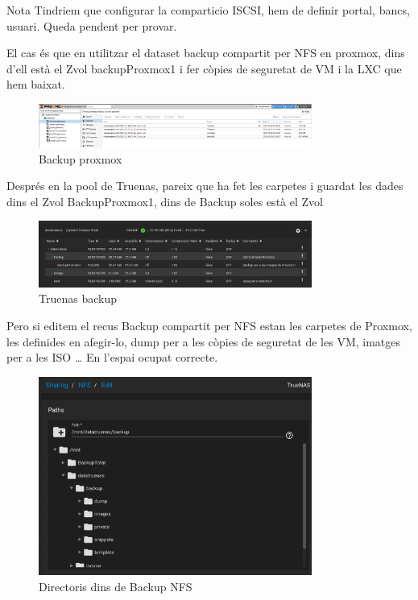 \documentclass[
  10pt,
]{krantz}
\begin{document}
\begin{rmdnote}{Nota}
Tindriem que configurar la comparticio ISCSI, hem de definir portal, bancs, usuari. Queda pendent per provar.

\end{rmdnote}

El cas és que en utilitzar el dataset backup compartit per NFS en proxmox, dins d'ell està el Zvol backupProxmox1 i fer còpies de seguretat de VM i la LXC que hem baixat.

\begin{figure}
\centering
\includegraphics[width=0.8\textwidth,height=\textheight]{imatges/proxmox/backup_proxmox_VMs.png}
\caption{Backup proxmox}
\end{figure}

Després en la pool de Truenas, pareix que ha fet les carpetes i guardat les dades dins el Zvol BackupProxmox1, dins de Backup soles està el Zvol

\begin{figure}
\centering
\includegraphics[width=0.8\textwidth,height=\textheight]{imatges/proxmox/backup_tuenas_vms.png}
\caption{Truenas backup}
\end{figure}

Pero si editem el recus Backup compartit per NFS estan les carpetes de Proxmox, les definides en afegir-lo, dump per a les còpies de seguretat de les VM, imatges per a les ISO \ldots{} En l'espai ocupat correcte.

\begin{figure}
\centering
\includegraphics[width=0.8\textwidth,height=\textheight]{imatges/proxmox/Backup_NFS_edit.png}
\caption{Directoris dins de Backup NFS}
\end{figure}
\end{document}
